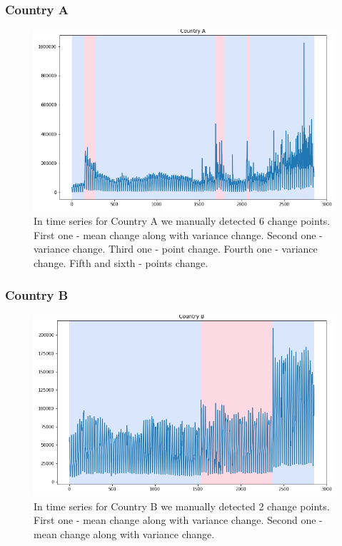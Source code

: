 \documentclass[intlimits, 9pt, unicode]{beamer}
\begin{document}
\begin{frame}
    \frametitle{Country A}
\begin{figure}
	\includegraphics[scale=0.30]{images/028_country_a}
	In time series for Country A we manually detected 6 change points. First one - mean change along with variance change. Second one - variance change. Third one - point change. Fourth one - variance change. Fifth and sixth - points change.
\end{figure}
\end{frame}

\begin{frame}
    \frametitle{Country B}
\begin{figure}
	\includegraphics[scale=0.30]{images/029_country_b}
	In time series for Country B we manually detected 2 change points. First one - mean change along with variance change. Second one - mean change along with variance change.
\end{figure}
\end{frame}
\end{document}
